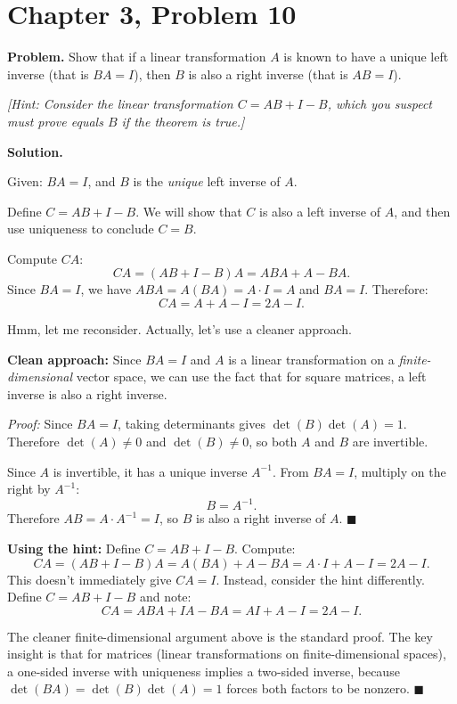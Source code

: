 \documentclass[12pt]{article}
\begin{document}
\section*{Chapter 3, Problem 10}

\textbf{Problem.} Show that if a linear transformation $A$ is known to have a unique left inverse (that is $BA = I$), then $B$ is also a right inverse (that is $AB = I$).

\textit{[Hint: Consider the linear transformation $C = AB + I - B$, which you suspect must prove equals $B$ if the theorem is true.]}

\bigskip
\textbf{Solution.}

Given: $BA = I$, and $B$ is the \emph{unique} left inverse of $A$.

Define $C = AB + I - B$. We will show that $C$ is also a left inverse of $A$, and then use uniqueness to conclude $C = B$.

Compute $CA$:
\[
CA = (AB + I - B)A = ABA + A - BA.
\]
Since $BA = I$, we have $ABA = A(BA) = A \cdot I = A$ and $BA = I$. Therefore:
\[
CA = A + A - I = 2A - I.
\]

Hmm, let me reconsider. Actually, let's use a cleaner approach.

\medskip
\textbf{Clean approach:} Since $BA = I$ and $A$ is a linear transformation on a \emph{finite-dimensional} vector space, we can use the fact that for square matrices, a left inverse is also a right inverse.

\textit{Proof:} Since $BA = I$, taking determinants gives $\det(B)\det(A) = 1$. Therefore $\det(A) \neq 0$ and $\det(B) \neq 0$, so both $A$ and $B$ are invertible.

Since $A$ is invertible, it has a unique inverse $A^{-1}$. From $BA = I$, multiply on the right by $A^{-1}$:
\[
B = A^{-1}.
\]
Therefore $AB = A \cdot A^{-1} = I$, so $B$ is also a right inverse of $A$. \hfill $\blacksquare$

\medskip
\textbf{Using the hint:} Define $C = AB + I - B$. Compute:
\[
CA = (AB + I - B)A = A(BA) + A - BA = A \cdot I + A - I = 2A - I.
\]
This doesn't immediately give $CA = I$. Instead, consider the hint differently. Define $C = AB + I - B$ and note:
\[
CA = ABA + IA - BA = AI + A - I = 2A - I.
\]

The cleaner finite-dimensional argument above is the standard proof. The key insight is that for matrices (linear transformations on finite-dimensional spaces), a one-sided inverse with uniqueness implies a two-sided inverse, because $\det(BA) = \det(B)\det(A) = 1$ forces both factors to be nonzero. \hfill $\blacksquare$
\end{document}
